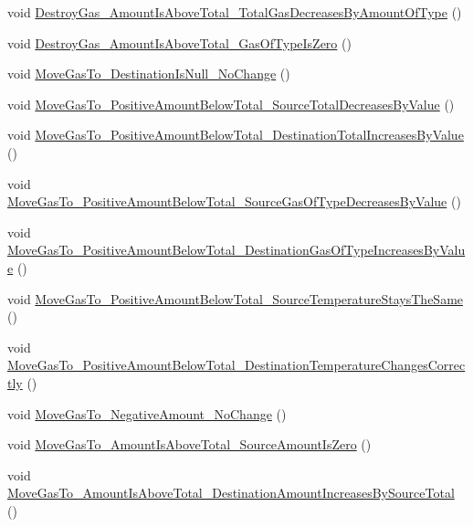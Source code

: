 \begin{DoxyCompactItemize}
\item 
void \hyperlink{class_atmosphere_component_test_abfc9d851661aec4eaaa5f278b414e04f}{Destroy\+Gas\+\_\+\+Amount\+Is\+Above\+Total\+\_\+\+Total\+Gas\+Decreases\+By\+Amount\+Of\+Type} ()
\item 
void \hyperlink{class_atmosphere_component_test_a25e993ccebce4a9ef31f575ac1877ec4}{Destroy\+Gas\+\_\+\+Amount\+Is\+Above\+Total\+\_\+\+Gas\+Of\+Type\+Is\+Zero} ()
\item 
void \hyperlink{class_atmosphere_component_test_ad715c53badbac25b0d726f0ddd95fb6d}{Move\+Gas\+To\+\_\+\+Destination\+Is\+Null\+\_\+\+No\+Change} ()
\item 
void \hyperlink{class_atmosphere_component_test_a005772642830129cf6e1cfc8493d1748}{Move\+Gas\+To\+\_\+\+Positive\+Amount\+Below\+Total\+\_\+\+Source\+Total\+Decreases\+By\+Value} ()
\item 
void \hyperlink{class_atmosphere_component_test_abe72c4e36404fc49f8d9eb19c14c5735}{Move\+Gas\+To\+\_\+\+Positive\+Amount\+Below\+Total\+\_\+\+Destination\+Total\+Increases\+By\+Value} ()
\item 
void \hyperlink{class_atmosphere_component_test_aded9f91b3b607e17c9e44cb440e3207a}{Move\+Gas\+To\+\_\+\+Positive\+Amount\+Below\+Total\+\_\+\+Source\+Gas\+Of\+Type\+Decreases\+By\+Value} ()
\item 
void \hyperlink{class_atmosphere_component_test_a3ff83b4347a0da9649600a2c8991e2f7}{Move\+Gas\+To\+\_\+\+Positive\+Amount\+Below\+Total\+\_\+\+Destination\+Gas\+Of\+Type\+Increases\+By\+Value} ()
\item 
void \hyperlink{class_atmosphere_component_test_ac3c53f91cd50e0301980e785d29ab8cf}{Move\+Gas\+To\+\_\+\+Positive\+Amount\+Below\+Total\+\_\+\+Source\+Temperature\+Stays\+The\+Same} ()
\item 
void \hyperlink{class_atmosphere_component_test_a30b5a0de20ccd7df5fbd01cbe692105b}{Move\+Gas\+To\+\_\+\+Positive\+Amount\+Below\+Total\+\_\+\+Destination\+Temperature\+Changes\+Correctly} ()
\item 
void \hyperlink{class_atmosphere_component_test_a7dc3c84129d2f8a288cc2d5fdd7e8a71}{Move\+Gas\+To\+\_\+\+Negative\+Amount\+\_\+\+No\+Change} ()
\item 
void \hyperlink{class_atmosphere_component_test_a004285a22974cfc4ec3bbbe490c6ce03}{Move\+Gas\+To\+\_\+\+Amount\+Is\+Above\+Total\+\_\+\+Source\+Amount\+Is\+Zero} ()
\item 
void \hyperlink{class_atmosphere_component_test_aa0632946873ddf67c4edff0d2b74ca21}{Move\+Gas\+To\+\_\+\+Amount\+Is\+Above\+Total\+\_\+\+Destination\+Amount\+Increases\+By\+Source\+Total} ()
\end{DoxyCompactItemize}


